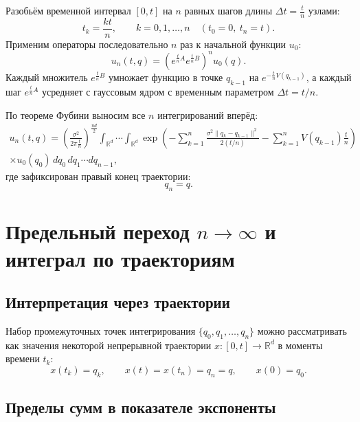 \documentclass[12pt,a4paper]{article}
\begin{document}
Разобьём временной интервал $[0, t]$ на $n$ равных шагов длины $\Delta t = \frac{t}{n}$ узлами:
\begin{equation}
    t_k = \frac{k t}{n}, \qquad k = 0, 1, \dots, n \quad (t_0 = 0, \ t_n = t).
\end{equation}
Применим операторы последовательно $n$ раз к начальной функции $u_0$:
\begin{equation}
    u_n(t, q) = \left( e^{\frac{t}{n}A} e^{\frac{t}{n}B} \right)^{\!\!n} u_0(q).
\end{equation}
Каждый множитель $e^{\frac{t}{n}B}$ умножает функцию в точке $q_{k-1}$ на $e^{-\frac{t}{n}V(q_{k-1})}$, а каждый шаг $e^{\frac{t}{n}A}$ усредняет с гауссовым ядром с временным параметром $\Delta t = t/n$.

По теореме Фубини выносим все $n$ интегрирований вперёд:
\begin{multline}
    \label{eq:n_integral}
    u_n(t, q) = \left(\frac{\sigma^2}{2\pi \frac{t}{n}}\right)^{\!\!\frac{nd}{2}} \int_{\mathbb{R}^d} \cdots \int_{\mathbb{R}^d} 
    \exp\!\left( -\sum_{k=1}^n \frac{\sigma^2 \|q_k - q_{k-1}\|^2}{2(t/n)} - \sum_{k=1}^n V(q_{k-1}) \frac{t}{n} \right) \\
    \times u_0(q_0) \, dq_0 \, dq_1 \cdots dq_{n-1},
\end{multline}
где зафиксирован правый конец траектории:
\begin{equation}
    q_n = q.
\end{equation}



\section{Предельный переход $n \to \infty$ и интеграл по траекториям}

\subsection{Интерпретация через траектории}
Набор промежуточных точек интегрирования $\{q_0, q_1, \dots, q_n\}$ можно рассматривать как значения некоторой непрерывной траектории $x \colon [0, t] \to \mathbb{R}^d$ в моменты времени $t_k$:
\begin{equation}
    x(t_k) = q_k, \qquad x(t) = x(t_n) = q_n = q, \qquad x(0) = q_0.
\end{equation}

\subsection{Пределы сумм в показателе экспоненты}
\end{document}
